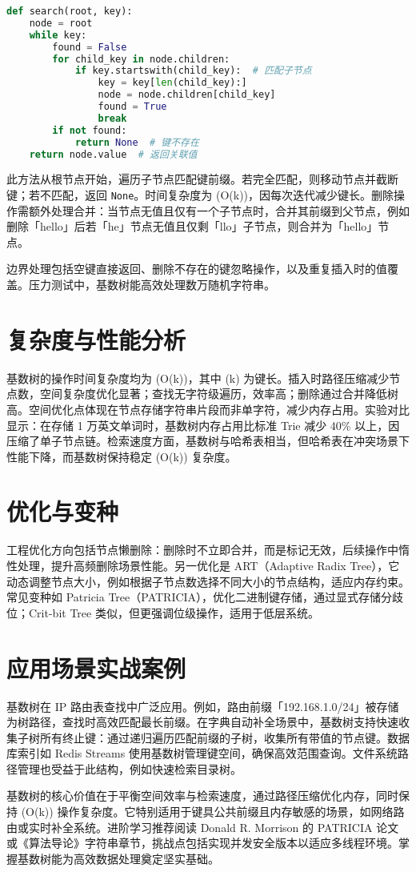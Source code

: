 \begin{lstlisting}[language=python]
def search(root, key):
    node = root
    while key:
        found = False
        for child_key in node.children:
            if key.startswith(child_key):  # 匹配子节点
                key = key[len(child_key):]
                node = node.children[child_key]
                found = True
                break
        if not found:
            return None  # 键不存在
    return node.value  # 返回关联值
\end{lstlisting}
此方法从根节点开始，遍历子节点匹配键前缀。若完全匹配，则移动节点并截断键；若不匹配，返回 \verb!None!。时间复杂度为 (O(k))，因每次迭代减少键长。删除操作需额外处理合并：当节点无值且仅有一个子节点时，合并其前缀到父节点，例如删除「hello」后若「he」节点无值且仅剩「llo」子节点，则合并为「hello」节点。\par
边界处理包括空键直接返回、删除不存在的键忽略操作，以及重复插入时的值覆盖。压力测试中，基数树能高效处理数万随机字符串。\par
\chapter{复杂度与性能分析}
基数树的操作时间复杂度均为 (O(k))，其中 (k) 为键长。插入时路径压缩减少节点数，空间复杂度优化显著；查找无字符级遍历，效率高；删除通过合并降低树高。空间优化点体现在节点存储字符串片段而非单字符，减少内存占用。实验对比显示：在存储 1 万英文单词时，基数树内存占用比标准 Trie 减少 40\%{} 以上，因压缩了单子节点链。检索速度方面，基数树与哈希表相当，但哈希表在冲突场景下性能下降，而基数树保持稳定 (O(k)) 复杂度。\par
\chapter{优化与变种}
工程优化方向包括节点懒删除：删除时不立即合并，而是标记无效，后续操作中惰性处理，提升高频删除场景性能。另一优化是 ART（Adaptive Radix Tree），它动态调整节点大小，例如根据子节点数选择不同大小的节点结构，适应内存约束。常见变种如 Patricia Tree（PATRICIA），优化二进制键存储，通过显式存储分歧位；Crit-bit Tree 类似，但更强调位级操作，适用于低层系统。\par
\chapter{应用场景实战案例}
基数树在 IP 路由表查找中广泛应用。例如，路由前缀「192.168.1.0/24」被存储为树路径，查找时高效匹配最长前缀。在字典自动补全场景中，基数树支持快速收集子树所有终止键：通过递归遍历匹配前缀的子树，收集所有带值的节点键。数据库索引如 Redis Streams 使用基数树管理键空间，确保高效范围查询。文件系统路径管理也受益于此结构，例如快速检索目录树。\par
基数树的核心价值在于平衡空间效率与检索速度，通过路径压缩优化内存，同时保持 (O(k)) 操作复杂度。它特别适用于键具公共前缀且内存敏感的场景，如网络路由或实时补全系统。进阶学习推荐阅读 Donald R. Morrison 的 PATRICIA 论文或《算法导论》字符串章节，挑战点包括实现并发安全版本以适应多线程环境。掌握基数树能为高效数据处理奠定坚实基础。\par
